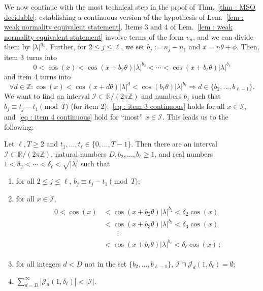 \documentclass[a4paper,UKenglish,cleveref, autoref, thm-restate]{lipics-v2021}
\begin{document}
We now continue with the most technical step in the proof of Thm.~\ref{thm : MSO decidable}: establishing a continuous version of the hypothesis of Lem.~\ref{lem : weak normality equivalent statement}.
Items 3 and 4 of Lem.~\ref{lem : weak normality equivalent statement} involve terms of the form $v_n$, and we can divide them by $|\lambda|^{n_1}$. 
Further, for $2 \le j \le \ell$, we set $b_j := n_j - n_1$ and $x = n\theta + \phi$.
Then, item 3 turns into
\begin{equation}\label{eq : item 3 continuous}
    0 < \cos(x) < \cos(x + b_2\theta)|\lambda|^{b_2} < \cdots < \cos(x + b_\ell\theta)|\lambda|^{b_\ell}
\end{equation}
and item 4 turns into 
\begin{equation}\label{eq : item 4 continuous}
    \forall d \in \mathbb{Z} \colon \cos(x) < \cos(x + d\theta)|\lambda|^d < \cos(b_\ell\theta)|\lambda|^{b_\ell} \Longrightarrow d \in \{ b_2,\dots,b_{\ell-1}\}.
\end{equation}
We want to find an interval $\mathcal{I} \subset \mathbb{R}/(2\pi\mathbb{Z})$ and numbers $b_j$ such that $b_j \equiv t_j - t_1 \pmod{T}$ (for item 2),~\eqref{eq : item 3 continuous} holds for all $x \in \mathcal{I}$, and~\eqref{eq : item 4 continuous} hold for ``most'' $x \in \mathcal{I}$.
This leads us to the following:
\begin{lemma}\label{lem : density weakly normal}
    Let $\ell, T \ge 2$ and $t_1, \dots, t_\ell \in \{0,\dots,T-1\}$. Then there are an interval $\mathcal{I} \subset \mathbb{R}/(2\pi\mathbb{Z})$, natural numbers $D, b_2,\dots,b_\ell \ge 1$, and real numbers $1 < \delta_2 < \cdots < \delta_\ell < \sqrt{|\lambda|}$ such that
    \begin{enumerate}
        \item[(a)] for all $2 \le j\le \ell$, $b_j \equiv t_j - t_1 \pmod T$;
        \item[(b)] for all $x \in \mathcal{I}$,
        \begin{align}\label{eq : cos seperated result}
            \begin{split}
                0 < \cos(x) &< \cos(x + b_2\theta)|\lambda|^{b_2} < \delta_2 \cos(x) \\
                & < \cos(x + b_3\theta)|\lambda|^{b_3} < \delta_3 \cos(x) \\
                &\quad\quad \vdots \\
                & < \cos(x + b_\ell\theta )|\lambda|^{b_\ell} < \delta_\ell \cos(x)\,;
            \end{split}
        \end{align}
        \item[(c)] for all integers $d < D$ not in the set $\{b_2,\dots,b_{\ell-1}\}$, $\mathcal{I} \cap \mathcal{J}_d(1, \delta_\ell) = \emptyset$;
        \item[(d)] $ \sum_{d = D}^\infty |\mathcal{J}_d(1, \delta_\ell)| < |\mathcal{I}|$.
    \end{enumerate}
\end{lemma}
\end{document}
